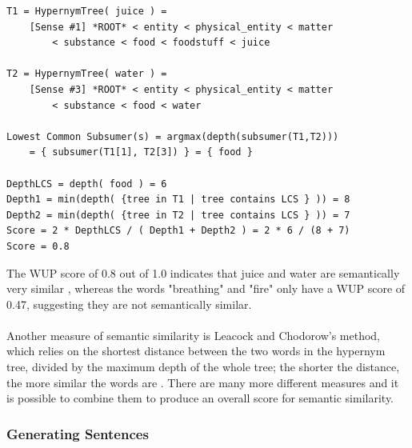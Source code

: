 \documentclass[12pt]{article}
\begin{document}
\begin{lstlisting}[frame=single]
T1 = HypernymTree( juice ) =
    [Sense #1] *ROOT* < entity < physical_entity < matter
    	< substance < food < foodstuff < juice

T2 = HypernymTree( water ) =
    [Sense #3] *ROOT* < entity < physical_entity < matter
    	< substance < food < water

Lowest Common Subsumer(s) = argmax(depth(subsumer(T1,T2)))
    = { subsumer(T1[1], T2[3]) } = { food }

DepthLCS = depth( food ) = 6
Depth1 = min(depth( {tree in T1 | tree contains LCS } )) = 8
Depth2 = min(depth( {tree in T2 | tree contains LCS } )) = 7
Score = 2 * DepthLCS / ( Depth1 + Depth2 ) = 2 * 6 / (8 + 7)
Score = 0.8
\end{lstlisting}

The WUP score of 0.8 out of 1.0 indicates that juice and water are semantically very similar \cite{RefWorks:47}, whereas the words "breathing" and "fire" only have a WUP score of 0.47, suggesting they are not semantically similar.
\\
\\
Another measure of semantic similarity is Leacock and Chodorow's method, which relies on the shortest distance between the two words in the hypernym tree, divided by the maximum depth of the whole tree; the shorter the distance, the more similar the words are \cite{RefWorks:46}. There are many more different measures and it is possible to combine them to produce an overall score for semantic similarity.

\subsubsection{Generating Sentences}
\end{document}
